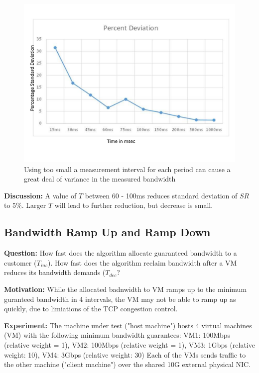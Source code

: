 \begin{figure}
\centering
\includegraphics[width=\columnwidth, trim=60pt 20mm 0pt 8mm]{figures/variation}
\caption{Using too small a measurement interval for each period can cause a great deal of variance in the measured bandwidth}
\label{variation}
\vspace{-3mm}
\end{figure}

{\bf Discussion:} A value of $T$ between 60 - 100ms reduces standard deviation
of $SR$ to $5\%$.  Larger $T$ will lead to further reduction, but decrease is
small. 

\subsection{Bandwidth Ramp Up and Ramp Down}

{\bf Question:}  How fast does the algorithm allocate guaranteed bandwidth to a
customer ($T_{inc}$).  How fast does the algorithm reclaim bandwidth after a VM
reduces its bandwidth demands ($T_{dec}$?

{\bf Motivation:}  While the allocated badnwidth to VM ramps up to the minimum
guranteed bandwidth in 4 intervals, the VM may not be able to ramp up as
quickly, due to limiations of the TCP congestion control.

{\bf Experiment:}  The machine under test ("host machine") hosts 4 virtual
machines (VM) with the following minimum bandwidth guarantees: VM1: 100Mbps
(relative weight = 1), VM2: 100Mbps (relative weight = 1), VM3: 1Gbps (relative
weight: 10), VM4: 3Gbps (relative weight: 30) Each of the VMs sends traffic to
the other machine ("client machine") over the shared 10G external physical NIC.

